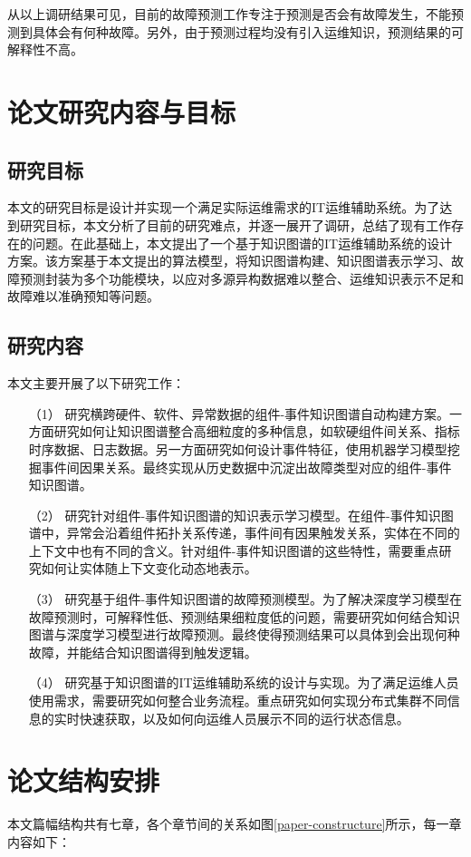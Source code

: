 从以上调研结果可见，目前的故障预测工作专注于预测是否会有故障发生，不能预测到具体会有何种故障。另外，由于预测过程均没有引入运维知识，预测结果的可解释性不高。

\section{论文研究内容与目标}
\subsection{研究目标}
本文的研究目标是设计并实现一个满足实际运维需求的IT运维辅助系统。为了达到研究目标，本文分析了目前的研究难点，并逐一展开了调研，总结了现有工作存在的问题。在此基础上，本文提出了一个基于知识图谱的IT运维辅助系统的设计方案。该方案基于本文提出的算法模型，将知识图谱构建、知识图谱表示学习、故障预测封装为多个功能模块，以应对多源异构数据难以整合、运维知识表示不足和故障难以准确预知等问题。

\subsection{研究内容}
本文主要开展了以下研究工作：
\begin{itemize}
    \item [（1）]研究横跨硬件、软件、异常数据的组件-事件知识图谱自动构建方案。一方面研究如何让知识图谱整合高细粒度的多种信息，如软硬组件间关系、指标时序数据、日志数据。另一方面研究如何设计事件特征，使用机器学习模型挖掘事件间因果关系。最终实现从历史数据中沉淀出故障类型对应的组件-事件知识图谱。
    \item [（2）]研究针对组件-事件知识图谱的知识表示学习模型。在组件-事件知识图谱中，异常会沿着组件拓扑关系传递，事件间有因果触发关系，实体在不同的上下文中也有不同的含义。针对组件-事件知识图谱的这些特性，需要重点研究如何让实体随上下文变化动态地表示。
    \item [（3）]研究基于组件-事件知识图谱的故障预测模型。为了解决深度学习模型在故障预测时，可解释性低、预测结果细粒度低的问题，需要研究如何结合知识图谱与深度学习模型进行故障预测。最终使得预测结果可以具体到会出现何种故障，并能结合知识图谱得到触发逻辑。
    \item [（4）]研究基于知识图谱的IT运维辅助系统的设计与实现。为了满足运维人员使用需求，需要研究如何整合业务流程。重点研究如何实现分布式集群不同信息的实时快速获取，以及如何向运维人员展示不同的运行状态信息。
\end{itemize}

\section{论文结构安排}
本文篇幅结构共有七章，各个章节间的关系如图\ref{paper-constructure}所示，每一章内容如下：

